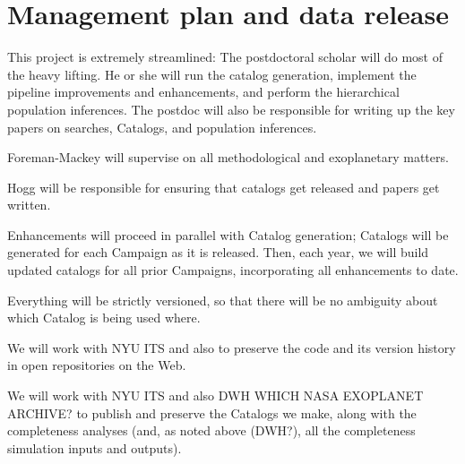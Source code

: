 \documentclass[12pt,preprint]{aastex}
\begin{document}
\section{Management plan and data release}

This project is extremely streamlined:
The postdoctoral scholar will do most of the heavy lifting.
He or she will run the catalog generation,
implement the pipeline improvements and enhancements,
and perform the hierarchical population inferences.
The postdoc will also be responsible for writing up the key papers
on searches, Catalogs, and population inferences.

Foreman-Mackey will supervise on all methodological and exoplanetary
matters.

Hogg will be responsible for ensuring that catalogs get released and
papers get written.

Enhancements will proceed in parallel with Catalog generation;
Catalogs will be generated for each Campaign as it is released.
Then, each year, we will build updated catalogs for all prior
Campaigns, incorporating all enhancements to date.

Everything will be strictly versioned, so that there will be no
ambiguity about which Catalog is being used where.

We will work with NYU ITS and also  to preserve
the code and its version history in open repositories on the Web.

We will work with NYU ITS and also DWH WHICH NASA EXOPLANET ARCHIVE?
to publish and preserve the Catalogs we make, along with the
completeness analyses (and, as noted above (DWH?), all the
completeness simulation inputs and outputs).
\end{document}
